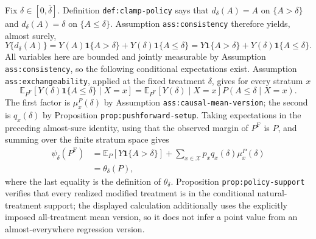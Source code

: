 Fix \(\delta\in[0,\bar\delta]\).  Definition \texttt{def:clamp-policy} says that \(d_\delta(A)=A\) on \(\{A>\delta\}\) and \(d_\delta(A)=\delta\) on \(\{A\leq\delta\}\).  Assumption \texttt{ass:consistency} therefore yields, almost surely,
\[
 Y\{d_\delta(A)\}
 =Y(A)\mathbf 1\{A>\delta\}+Y(\delta)\mathbf 1\{A\leq\delta\}
 =Y\mathbf 1\{A>\delta\}+Y(\delta)\mathbf 1\{A\leq\delta\}.
\]
All variables here are bounded and jointly measurable by Assumption \texttt{ass:consistency}, so the following conditional expectations exist.  Assumption \texttt{ass:exchangeability}, applied at the fixed treatment \(\delta\), gives for every stratum \(x\)
\[
 \mathbb E_{P^{\mathrm F}}[Y(\delta)\mathbf 1\{A\leq\delta\}\mid X=x]
 =\mathbb E_{P^{\mathrm F}}[Y(\delta)\mid X=x]
   P(A\leq\delta\mid X=x).
\]
The first factor is \(\mu_x^P(\delta)\) by Assumption \texttt{ass:causal-mean-version}; the second is \(q_x(\delta)\) by Proposition \texttt{prop:pushforward-setup}.  Taking expectations in the preceding almost-sure identity, using that the observed margin of \(P^{\mathrm F}\) is \(P\), and summing over the finite stratum space gives
\[
 \begin{aligned}
 \psi_\delta(P^{\mathrm F})
 &=\mathbb E_P[Y\mathbf 1\{A>\delta\}]
   +\sum_{x\in\mathcal X}p_xq_x(\delta)\mu_x^P(\delta)\\
 &=\theta_\delta(P),
 \end{aligned}
\]
where the last equality is the definition of \(\theta_\delta\).  Proposition \texttt{prop:policy-support} verifies that every realized modified treatment is in the conditional natural-treatment support; the displayed calculation additionally uses the explicitly imposed all-treatment mean version, so it does not infer a point value from an almost-everywhere regression version.